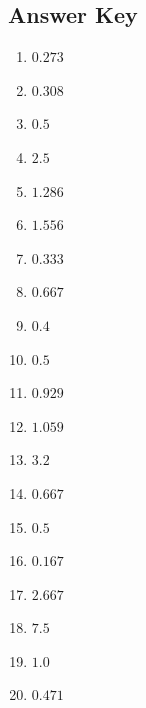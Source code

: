\documentclass{article}
\begin{document}
\newpage

\subsection*{Answer Key}

\begin{enumerate}
\item $\displaystyle 0.273 $ \ 
\item $\displaystyle 0.308 $ \ 
\item $\displaystyle 0.5 $ \ 
\item $\displaystyle 2.5 $ \ 
\item $\displaystyle 1.286 $ \ 
\item $\displaystyle 1.556 $ \ 
\item $\displaystyle 0.333 $ \ 
\item $\displaystyle 0.667 $ \ 
\item $\displaystyle 0.4 $ \ 
\item $\displaystyle 0.5 $ \ 
\item $\displaystyle 0.929 $ \ 
\item $\displaystyle 1.059 $ \ 
\item $\displaystyle 3.2 $ \ 
\item $\displaystyle 0.667 $ \ 
\item $\displaystyle 0.5 $ \ 
\item $\displaystyle 0.167 $ \ 
\item $\displaystyle 2.667 $ \ 
\item $\displaystyle 7.5 $ \ 
\item $\displaystyle 1.0 $ \ 
\item $\displaystyle 0.471 $ \ 

\end{enumerate}
\end{document}
